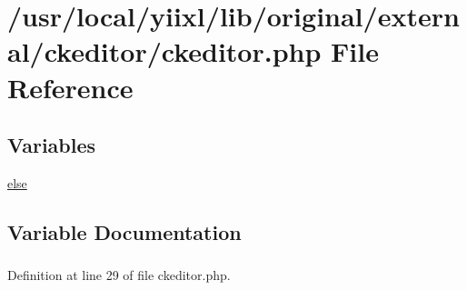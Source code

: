 \hypertarget{ckeditor_8php}{
\section{/usr/local/yiixl/lib/original/external/ckeditor/ckeditor.php File Reference}
\label{ckeditor_8php}
}
\subsection*{Variables}
\begin{DoxyCompactItemize}
\item 
\hyperlink{ckeditor_8php_a0544c3fe466e421738dae463968b70ba}{else}
\end{DoxyCompactItemize}


\subsection{Variable Documentation}
\hypertarget{ckeditor_8php_a0544c3fe466e421738dae463968b70ba}{
\subsubsection[{else}]{}}
\label{ckeditor_8php_a0544c3fe466e421738dae463968b70ba}


Definition at line 29 of file ckeditor.php.

